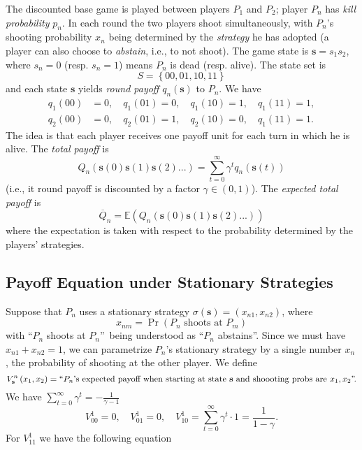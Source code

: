 \documentclass{article}%
\numberwithin{equation}{section}
\begin{document}
The discounted base game is played between players $P_{1}$ and $P_{2}$; player
$P_{n}$ has \emph{kill probability }$p_{n}$. In each round the two players
shoot simultaneously, with $P_{n}$'s shooting probability $x_{n}$ being
determined by the \emph{strategy} he has adopted (a player can also choose to
\emph{abstain}, i.e., to not shoot). The game state is $\mathbf{s}=s_{1}s_{2}%
$, where $s_{n}=0$ (resp. $s_{n}=1$) means $P_{n}$ is dead (resp. alive). The
state set is
\[
S=\left\{  00,01,10,11\right\}
\]
and each state $\mathbf{s}$ yields \emph{round payoff} $q_{n}\left(
\mathbf{s}\right)  $ to $P_{n}$. We have
\begin{align*}
q_{1}\left(  00\right)   &  =0,\quad q_{1}\left(  01\right)  =0,\quad
q_{1}\left(  10\right)  =1,\quad q_{1}\left(  11\right)  =1,\\
q_{2}\left(  00\right)   &  =0,\quad q_{2}\left(  01\right)  =1,\quad
q_{2}\left(  10\right)  =0,\quad q_{1}\left(  11\right)  =1.
\end{align*}
The idea is that each player receives one payoff unit for each turn in which
he is alive. The \emph{total payoff} is%
\[
Q_{n}\left(  \mathbf{s}\left(  0\right)  \mathbf{s}\left(  1\right)
\mathbf{s}\left(  2\right)  ...\right)  =\sum_{t=0}^{\infty}\gamma^{t}%
q_{n}\left(  \mathbf{s}\left(  t\right)  \right)
\]
(i.e., it round payoff is discounted by a factor $\gamma\in\left(  0,1\right)
$). The \emph{expected total payoff} is%
\[
\overline{Q}_{n}=\mathbb{E}\left(  Q_{n}\left(  \mathbf{s}\left(  0\right)
\mathbf{s}\left(  1\right)  \mathbf{s}\left(  2\right)  ...\right)  \right)
\]
where the expectation is taken with respect to the probability determined by
the players' strategies.

\subsection{Payoff Equation under Stationary Strategies}

Suppose that $P_{n}$ uses a stationary strategy $\sigma\left(  \mathbf{s}%
\right)  =\left(  x_{n1},x_{n2}\right)  $, where
\[
x_{nm}=\Pr\left(  P_{n}\text{ shoots at }P_{m}\right)
\]
with \textquotedblleft$P_{n}$ shoots at $P_{n}$\textquotedblright\ being
understood as \textquotedblleft$P_{n}$ abstains\textquotedblright. Since we
must have $x_{n1}+x_{n2}=1$, we can parametrize $P_{n}$'s stationary strategy
by a single number $x_{n}$, the probability of shooting at the other player.
We define%
\[
V_{\mathbf{s}}^{n}\left(  x_{1},x_{2}\right)  =\text{\textquotedblleft}%
P_{n}\text{'s expected payoff when starting at state }\mathbf{s}\text{ and
shoooting probs are }x_{1},x_{2}\text{\textquotedblright.}%
\]
We have $\sum_{t=0}^{\infty}\gamma^{t}=\allowbreak-\frac{1}{\gamma-1}$
\[
V_{00}^{1}=0,\quad V_{01}^{1}=0,\quad V_{10}^{1}=\sum_{t=0}^{\infty}\gamma
^{t}\cdot1=\frac{1}{1-\gamma}.
\]
For $V_{11}^{1}$ we have the following equation%
\end{document}
